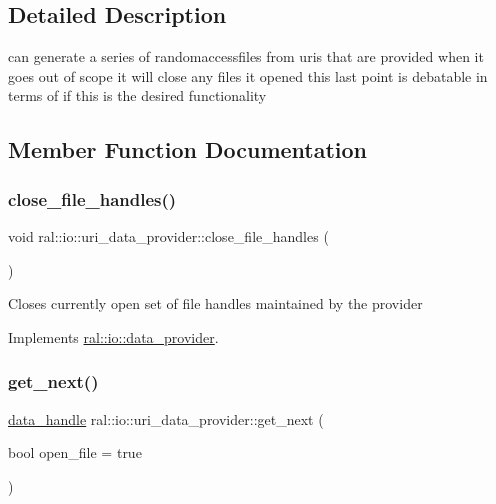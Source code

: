\subsection{Detailed Description}
can generate a series of randomaccessfiles from uris that are provided when it goes out of scope it will close any files it opened this last point is debatable in terms of if this is the desired functionality 

\subsection{Member Function Documentation}
\mbox{\label{classral_1_1io_1_1uri__data__provider_afb66fcd6bc0ac46a75d195f160f9ec45}} 
\subsubsection{\texorpdfstring{close\+\_\+file\+\_\+handles()}{close\_file\_handles()}}
{\footnotesize\ttfamily void ral\+::io\+::uri\+\_\+data\+\_\+provider\+::close\+\_\+file\+\_\+handles (\begin{DoxyParamCaption}{ }\end{DoxyParamCaption})\hspace{0.3cm}{\ttfamily [virtual]}}

Closes currently open set of file handles maintained by the provider 

Implements \hyperlink{classral_1_1io_1_1data__provider_afa6216bccde854b011ed098e114ba8b3}{ral\+::io\+::data\+\_\+provider}.

\mbox{\label{classral_1_1io_1_1uri__data__provider_a189c193c14fdabc3dd84dca1385688d0}} 
\subsubsection{\texorpdfstring{get\+\_\+next()}{get\_next()}}
{\footnotesize\ttfamily \hyperlink{structral_1_1io_1_1data__handle}{data\+\_\+handle} ral\+::io\+::uri\+\_\+data\+\_\+provider\+::get\+\_\+next (\begin{DoxyParamCaption}\item[{bool}]{open\+\_\+file = {\ttfamily true} }\end{DoxyParamCaption})\hspace{0.3cm}{\ttfamily [virtual]}}

